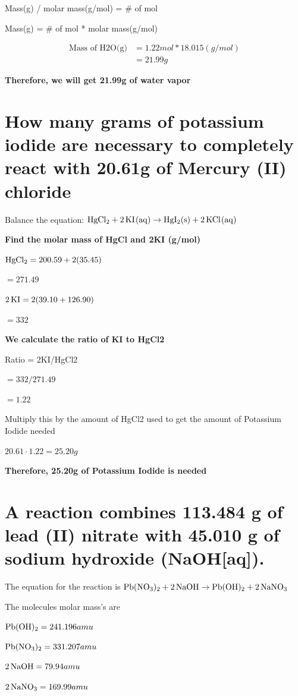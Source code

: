 \documentclass{scrartcl}
\begin{document}
Mass(g) / molar mass(g/mol) = \# of mol

Mass(g) = \# of mol * molar mass(g/mol)

\begin{align*}
\text{Mass of H2O(g)}&=1.22mol * 18.015(g/mol)\\
&= 21.99g
\end{align*}

\textbf{Therefore, we will get 21.99g of water vapor}

\section{How many grams of potassium iodide are necessary to completely react with 20.61g of Mercury (II) chloride}
\label{sec:orga18793d}
Balance the equation:
\(\ce{HgCl2 + 2KI(aq)} \rightarrow \ce{HgI2(s) + 2KCl(aq)}\)

\textbf{Find the molar mass of HgCl and 2KI (g/mol)}

\(\ce{HgCl2} = 200.59 + 2(35.45)\)

\(= 271.49\)

\(\ce{2KI} = 2(39.10 + 126.90)\)

\(= 332\)

\textbf{We calculate the ratio of KI to HgCl2}

Ratio = 2KI/HgCl2

\(= 332/271.49\)

\(= 1.22\)

Multiply this by the amount of HgCl2 used to get the amount of Potassium Iodide
needed

\(20.61 \cdot 1.22 = 25.20g\)

\textbf{Therefore, 25.20g of Potassium Iodide is needed}

\section{A reaction combines 113.484 g of lead (II) nitrate with 45.010 g of sodium hydroxide (NaOH[aq]).}
\label{sec:org3858a5e}
The equation for the reaction is
\(\ce{Pb(NO3)2}+\ce{2NaOH}\rightarrow\ce{Pb(OH)2}+\ce{2NaNO3}\)

The molecules molar mass's are

\(\ce{Pb(OH)2}=241.196 amu\)

\(\ce{Pb(NO3)2}=331.207 amu\)

\(\ce{2NaOH}=79.94 amu\)

\(\ce{2NaNO3}=169.99 amu\)
\end{document}
